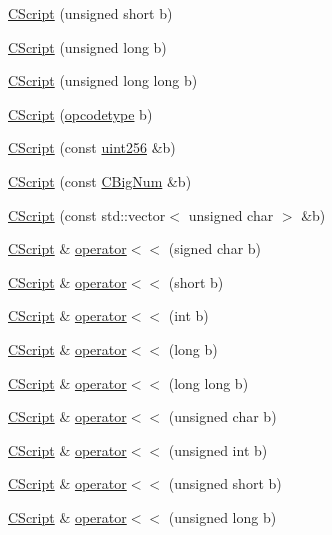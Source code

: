 \begin{DoxyCompactItemize}
\item 
\hyperlink{class_c_script_a00ae1d612664442f4bebc03a73ac53b1}{C\+Script} (unsigned short b)
\item 
\hyperlink{class_c_script_af3752b74d2be0a0369656da523a1323a}{C\+Script} (unsigned long b)
\item 
\hyperlink{class_c_script_a87b5b220479a53bd33de58aa58517cd8}{C\+Script} (unsigned long long b)
\item 
\hyperlink{class_c_script_a8214376dea81245d33a44a2ea7c2cdc3}{C\+Script} (\hyperlink{script_8h_a63e349a6089a54da9fe09a3d858648bd}{opcodetype} b)
\item 
\hyperlink{class_c_script_ac6e18fc38394ffe9106d9a92e89de1f6}{C\+Script} (const \hyperlink{classuint256}{uint256} \&b)
\item 
\hyperlink{class_c_script_a014fc30e86c347e56e0209f162a1ccf5}{C\+Script} (const \hyperlink{class_c_big_num}{C\+Big\+Num} \&b)
\item 
\hyperlink{class_c_script_ab2348dd32f252c468f793ec290924603}{C\+Script} (const std\+::vector$<$ unsigned char $>$ \&b)
\item 
\hyperlink{class_c_script}{C\+Script} \& \hyperlink{class_c_script_abdf14321fc2c312c6511d71a93c3e203}{operator$<$$<$} (signed char b)
\item 
\hyperlink{class_c_script}{C\+Script} \& \hyperlink{class_c_script_adeaf67a2297341084f491391c5e30dbc}{operator$<$$<$} (short b)
\item 
\hyperlink{class_c_script}{C\+Script} \& \hyperlink{class_c_script_a9ee5ba660433d0a94dc878abb6a52cb7}{operator$<$$<$} (int b)
\item 
\hyperlink{class_c_script}{C\+Script} \& \hyperlink{class_c_script_ab7ef0495ce132d037a1e9b4a587cb85d}{operator$<$$<$} (long b)
\item 
\hyperlink{class_c_script}{C\+Script} \& \hyperlink{class_c_script_a0c0586f1299a5616d90ca15a892224e0}{operator$<$$<$} (long long b)
\item 
\hyperlink{class_c_script}{C\+Script} \& \hyperlink{class_c_script_aff101499fddf174a76ebfb26703a623f}{operator$<$$<$} (unsigned char b)
\item 
\hyperlink{class_c_script}{C\+Script} \& \hyperlink{class_c_script_a40ad78fa50bf8c0c123d4d7dd6f312f5}{operator$<$$<$} (unsigned int b)
\item 
\hyperlink{class_c_script}{C\+Script} \& \hyperlink{class_c_script_a53021b06198de8c0e1b90573ab40288a}{operator$<$$<$} (unsigned short b)
\item 
\hyperlink{class_c_script}{C\+Script} \& \hyperlink{class_c_script_a776d16c903e9247168478d4a4a1657ec}{operator$<$$<$} (unsigned long b)

\end{DoxyCompactItemize}
